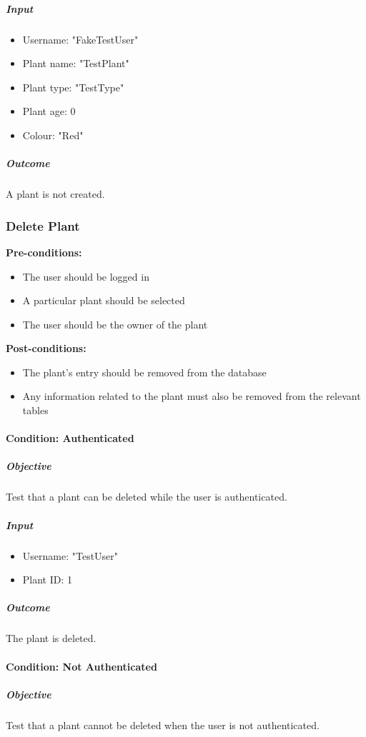 \documentclass{article}
\begin{document}
		\subparagraph{Input}
		\begin{itemize}
			\item Username: "FakeTestUser"
			\item Plant name: "TestPlant"
			\item Plant type: "TestType"
			\item Plant age: 0
			\item Colour: "Red"
		\end{itemize}
		
		\subparagraph{Outcome}
		A plant is not created.
		
		\subsubsection{Delete Plant}
		
		\textbf{Pre-conditions:}
		\begin{itemize}
			\item The user should be logged in
			\item A particular plant should be selected
			\item The user should be the owner of the plant
		\end{itemize}
		\textbf{Post-conditions:}
		\begin{itemize}
			\item The plant's entry should be removed from the database
			\item Any information related to the plant must also be removed from the relevant tables
		\end{itemize}
		
		\paragraph{Condition: Authenticated}
		\subparagraph{Objective}
		Test that a plant can be deleted while the user is authenticated.
		
		\subparagraph{Input}
		\begin{itemize}
			\item Username: "TestUser"
			\item Plant ID: 1
		\end{itemize}
		
		\subparagraph{Outcome}
		The plant is deleted.
		
		\paragraph{Condition: Not Authenticated}
		\subparagraph{Objective}
		Test that a plant cannot be deleted when the user is not authenticated.
		
\end{document}
